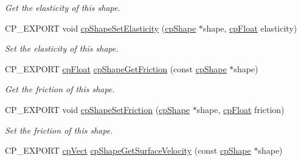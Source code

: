 \begin{DoxyCompactItemize}
\begin{DoxyCompactList}\small\item\em Get the elasticity of this shape. \end{DoxyCompactList}\item 
\mbox{\label{group__cp_shape_ga746fd50b3e2b1d4deb25f2ecb2654028}} 
C\+P\+\_\+\+E\+X\+P\+O\+RT void \mbox{\hyperlink{group__cp_shape_ga746fd50b3e2b1d4deb25f2ecb2654028}{cp\+Shape\+Set\+Elasticity}} (\mbox{\hyperlink{structcp_shape}{cp\+Shape}} $\ast$shape, \mbox{\hyperlink{group__basic_types_gac1ed65573e035bf892505768c852d8d3}{cp\+Float}} elasticity)
\begin{DoxyCompactList}\small\item\em Set the elasticity of this shape. \end{DoxyCompactList}\item 
\mbox{\label{group__cp_shape_gae03dcb3f6221e41cf677eeca42aab280}} 
C\+P\+\_\+\+E\+X\+P\+O\+RT \mbox{\hyperlink{group__basic_types_gac1ed65573e035bf892505768c852d8d3}{cp\+Float}} \mbox{\hyperlink{group__cp_shape_gae03dcb3f6221e41cf677eeca42aab280}{cp\+Shape\+Get\+Friction}} (const \mbox{\hyperlink{structcp_shape}{cp\+Shape}} $\ast$shape)
\begin{DoxyCompactList}\small\item\em Get the friction of this shape. \end{DoxyCompactList}\item 
\mbox{\label{group__cp_shape_ga2ffe1f94c19a1b248e7784216862add9}} 
C\+P\+\_\+\+E\+X\+P\+O\+RT void \mbox{\hyperlink{group__cp_shape_ga2ffe1f94c19a1b248e7784216862add9}{cp\+Shape\+Set\+Friction}} (\mbox{\hyperlink{structcp_shape}{cp\+Shape}} $\ast$shape, \mbox{\hyperlink{group__basic_types_gac1ed65573e035bf892505768c852d8d3}{cp\+Float}} friction)
\begin{DoxyCompactList}\small\item\em Set the friction of this shape. \end{DoxyCompactList}\item 
\mbox{\label{group__cp_shape_gaa353b1aa872bad9549d45c05bcdb4722}} 
C\+P\+\_\+\+E\+X\+P\+O\+RT \mbox{\hyperlink{structcp_vect}{cp\+Vect}} \mbox{\hyperlink{group__cp_shape_gaa353b1aa872bad9549d45c05bcdb4722}{cp\+Shape\+Get\+Surface\+Velocity}} (const \mbox{\hyperlink{structcp_shape}{cp\+Shape}} $\ast$shape)

\end{DoxyCompactItemize}
